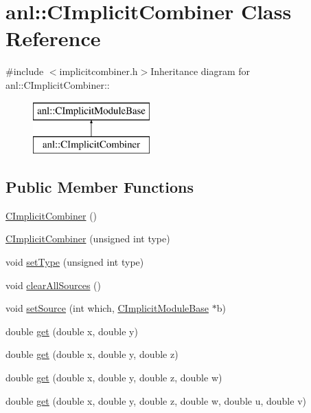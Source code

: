 \hypertarget{classanl_1_1CImplicitCombiner}{
\section{anl::CImplicitCombiner Class Reference}
\label{classanl_1_1CImplicitCombiner}
}


{\ttfamily \#include $<$implicitcombiner.h$>$}Inheritance diagram for anl::CImplicitCombiner::\begin{figure}[H]
\begin{center}
\leavevmode
\includegraphics[height=2cm]{classanl_1_1CImplicitCombiner}
\end{center}
\end{figure}
\subsection*{Public Member Functions}
\begin{DoxyCompactItemize}
\item 
\hyperlink{classanl_1_1CImplicitCombiner_a7818797a1a47a913afe578efce883376}{CImplicitCombiner} ()
\item 
\hyperlink{classanl_1_1CImplicitCombiner_aa0bd0fa516387b46efb5f8642ce3ef8f}{CImplicitCombiner} (unsigned int type)
\item 
void \hyperlink{classanl_1_1CImplicitCombiner_a52cc9cc6c8b21f529ededdde2b160f68}{setType} (unsigned int type)
\item 
void \hyperlink{classanl_1_1CImplicitCombiner_a165b52c3beea8e67d2570bad2a8b67ac}{clearAllSources} ()
\item 
void \hyperlink{classanl_1_1CImplicitCombiner_a6b34ce5f8ace58ad566d5d5314c2dd0c}{setSource} (int which, \hyperlink{classanl_1_1CImplicitModuleBase}{CImplicitModuleBase} $\ast$b)
\item 
double \hyperlink{classanl_1_1CImplicitCombiner_a4fac6a4b68eea473c48b2c2cb914c2bd}{get} (double x, double y)
\item 
double \hyperlink{classanl_1_1CImplicitCombiner_a44bf6015e5f1895cc494ed7188401172}{get} (double x, double y, double z)
\item 
double \hyperlink{classanl_1_1CImplicitCombiner_aaaeeee91ac651cd74432806f8533d9e6}{get} (double x, double y, double z, double w)
\item 
double \hyperlink{classanl_1_1CImplicitCombiner_ad4b8babff3aebe409e931a4453c0f617}{get} (double x, double y, double z, double w, double u, double v)
\end{DoxyCompactItemize}

